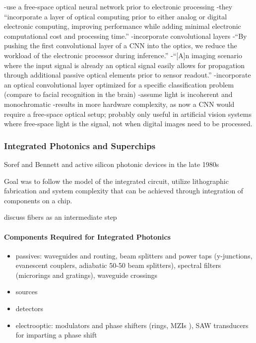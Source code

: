 \cite{chsi2018}
-use a free-space optical neural network prior to electronic processing
-they ``incorporate a layer of optical computing prior to either analog or digital electronic computing, improving performance while adding minimal electronic computational cost and processing time.''
-incorporate convolutional layers
-``By pushing the first convolutional layer of a CNN into the optics, we reduce the workload of the electronic processor during inference.''
-``[A]n imaging scenario where the input signal is already an optical signal easily allows for propagation through additional passive optical elements prior to sensor readout.''
-incorporate an optical convolutional layer optimized for a specific classification problem (compare to facial recognition in the brain)
-assume light is incoherent and monochromatic
-results in more hardware complexity, as now a CNN would require a free-space optical setup; probably only useful in artificial vision systems where free-space light is the signal, not when digital images need to be processed.

\subsubsection{Integrated Photonics and Superchips}
Soref and Bennett and active silicon photonic devices in the late 1980s

\vspace{3em}
Goal was to follow the model of the integrated circuit, utilize lithographic fabrication and system complexity that can be achieved through integration of components on a chip. 

\vspace{3em}
discuss fibers as an intermediate step
\paragraph{Components Required for Integrated Photonics}
\begin{itemize}
\item passives: waveguides and routing, beam splitters and power taps (y-junctions, evanescent couplers, adiabatic 50-50 beam splitters), spectral filters (microrings \cite{ra2007} and gratings), waveguide crossings
\item sources
\item detectors
\item electrooptic: modulators and phase shifters (rings, MZIs \cite{ohno1975}), SAW transducers for imparting a phase shift
\end{itemize}

